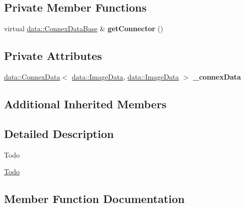 \subsection*{Private Member Functions}
\begin{DoxyCompactItemize}
\item 
\mbox{\label{classfilter_1_1algos_1_1_overlay_mat_filter_a374c3c81ae4f6ace1948dfe091e634e4}} 
virtual \hyperlink{classfilter_1_1data_1_1_connex_data_base}{data\+::\+Connex\+Data\+Base} \& {\bfseries get\+Connector} ()
\end{DoxyCompactItemize}
\subsection*{Private Attributes}
\begin{DoxyCompactItemize}
\item 
\mbox{\label{classfilter_1_1algos_1_1_overlay_mat_filter_a0d4a7a3a785cac620ca8c99425b7ae7a}} 
\hyperlink{classfilter_1_1data_1_1_connex_data}{data\+::\+Connex\+Data}$<$ \hyperlink{classfilter_1_1data_1_1_image_data}{data\+::\+Image\+Data}, \hyperlink{classfilter_1_1data_1_1_image_data}{data\+::\+Image\+Data} $>$ {\bfseries \+\_\+connex\+Data}
\end{DoxyCompactItemize}
\subsection*{Additional Inherited Members}


\subsection{Detailed Description}
\begin{DoxyRefDesc}{Todo}
\item[\hyperlink{todo__todo000012}{Todo}]\end{DoxyRefDesc}


\subsection{Member Function Documentation}
\mbox{\label{classfilter_1_1algos_1_1_overlay_mat_filter_a819c132897fd3a1e4f4f28378313ccdd}} 
